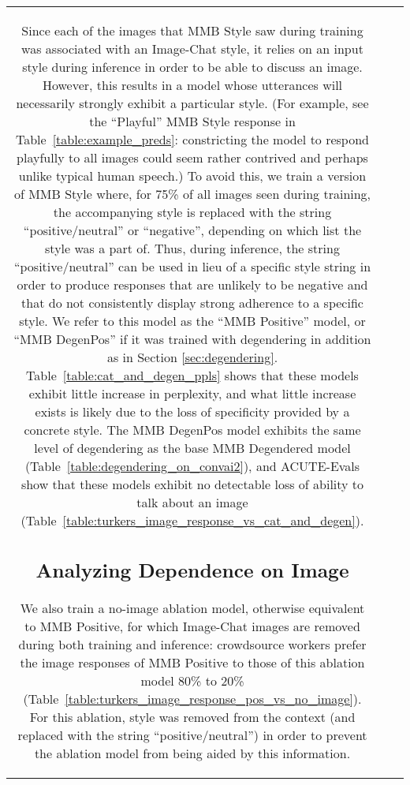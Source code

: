 \documentclass[11pt,a4paper]{article}
\begin{document}
\begin{table*}[t!]
\begin{adjustbox}{center=15.5cm}
\begin{small}
\begin{tabular*}{\textwidth}{ccl}
Since each of the images that MMB Style saw during training was associated with an Image-Chat style, it relies on an input style during inference in order to be able to discuss an image. However, this results in a model whose utterances will necessarily strongly exhibit a particular style. (For example, see the ``Playful'' MMB Style response in Table~\ref{table:example_preds}: constricting the model to respond playfully to all images could seem rather contrived and perhaps unlike typical human speech.) To avoid this, we train a version of MMB Style where, for 75\% of all images seen during training, the accompanying style is replaced with the string ``positive/neutral'' or ``negative'', depending on which list the style was a part of. Thus, during inference, the string ``positive/neutral'' can be used in lieu of a specific style string in order to produce responses that are unlikely to be negative and that do not consistently display strong adherence to a specific style. We refer to this model as the ``MMB Positive'' model, or ``MMB DegenPos'' if it was trained with degendering in addition as in Section \ref{sec:degendering}. Table~\ref{table:cat_and_degen_ppls} shows that these models exhibit little increase in perplexity, and what little increase exists is likely due to the loss of specificity provided by a concrete style. The MMB DegenPos model exhibits the same level of degendering as the base MMB Degendered model (Table~\ref{table:degendering_on_convai2}), and ACUTE-Evals show that these models exhibit no detectable loss of ability to talk about an image (Table~\ref{table:turkers_image_response_vs_cat_and_degen}).

\subsection{Analyzing Dependence on Image}
\label{sec:image_ablation}

We also train a no-image ablation model, otherwise equivalent to MMB Positive, for which Image-Chat images are removed during both training and inference: crowdsource workers prefer the image responses of MMB Positive to those of this ablation model 80\% to 20\% (Table~\ref{table:turkers_image_response_pos_vs_no_image}). For this ablation, style was removed from the context (and replaced with the string ``positive/neutral'') in order to prevent the ablation model from being aided by this information.


\end{tabular*}
\end{small}
\end{adjustbox}
\end{table*}
\end{document}

